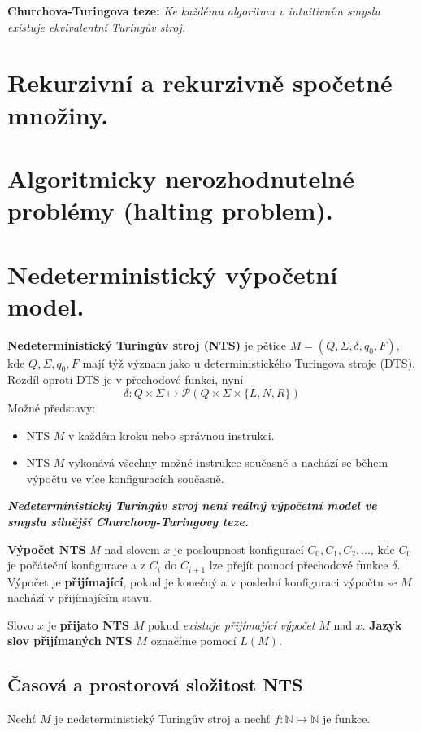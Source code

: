 \documentclass[11pt]{report} %
\newcommand{\N}{\mathbb{N}}
\begin{document}
\noindent\textbf{Churchova-Turingova teze:} \textit{Ke každému algoritmu v intuitivním smyslu existuje ekvivalentní Turingův stroj.}

\section{Rekurzivní a rekurzivně spočetné množiny.}
\section{Algoritmicky nerozhodnutelné problémy (halting problem).}
\section{Nedeterministický výpočetní model.}
\textbf{Nedeterministický Turingův stroj (NTS)} je pětice $M = (Q, \Sigma, \delta, q_0, F)$, kde $Q, \Sigma, q_0, F$ mají týž význam jako u  deterministického Turingova stroje (DTS). Rozdíl oproti DTS je v přechodové funkci, nyní
$$\delta : Q \times \Sigma \mapsto \mathcal{P}(Q \times \Sigma \times \{L, N, R\})$$
Možné představy:
\begin{itemize}
	\leftskip 20pt
	\setlength{\itemsep}{0pt}
	\item NTS $M$ v každém kroku  nebo  správnou instrukci.
	\item NTS $M$ vykonává všechny možné instrukce současně a nachází se během výpočtu ve více konfiguracích současně.
\end{itemize}

\textbf{\textit{Nedeterministický Turingův stroj není reálný výpočetní model ve smyslu silnější Churchovy-Turingovy teze.}}
\medskip

\textbf{Výpočet NTS} $M$ nad slovem $x$ je posloupnost konfigurací $C_0, C_1, C_2, \dots$, kde $C_0$ je počáteční konfigurace a z $C_i$ do $C_{i+1}$ lze přejít pomocí přechodové funkce $\delta$. Výpočet je \textbf{přijímající}, pokud je konečný a v poslední konfiguraci výpočtu se $M$ nachází v přijímajícím stavu.

Slovo $x$ je \textbf{přijato NTS} $M$ pokud \textit{existuje přijímající výpočet} $M$ nad $x$. \textbf{Jazyk slov přijímaných NTS} $M$ označíme pomocí $L(M)$.

\subsection{Časová a prostorová složitost NTS}
Nechť $M$ je nedeterministický Turingův stroj a nechť $f : \N \mapsto \N$ je funkce.
\end{document}
